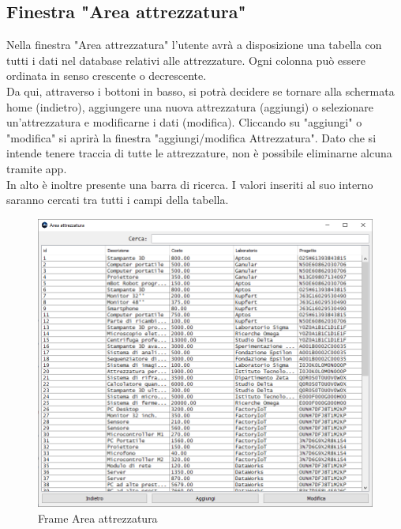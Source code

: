         \subsection {Finestra "Area attrezzatura"}
            Nella finestra "Area attrezzatura" l'utente avrà a disposizione una tabella con tutti i dati nel database relativi alle attrezzature. Ogni colonna può essere ordinata in senso crescente o decrescente.\\
            Da qui, attraverso i bottoni in basso, si potrà decidere se tornare alla schermata home (indietro), aggiungere una nuova attrezzatura (aggiungi) o selezionare un'attrezzatura e modificarne i dati (modifica). Cliccando su "aggiungi" o "modifica" si aprirà la finestra "aggiungi/modifica Attrezzatura". Dato che si intende tenere traccia di tutte le attrezzature, non è possibile eliminarne alcuna tramite app.\\
            In alto è inoltre presente una barra di ricerca. I valori inseriti al suo interno saranno cercati tra tutti i campi della tabella.
            \begin{figure}[htbp!]
                \centering
                    \vspace{2\baselineskip}
                    \includegraphics[width=0.9\linewidth]{Immagini/Frames/Frame Area/Frame Area attrezzatura.png}
                \caption{Frame Area attrezzatura}
                \label{fig:Frame Area attrezzatura}
            \end{figure}

    \newpage

